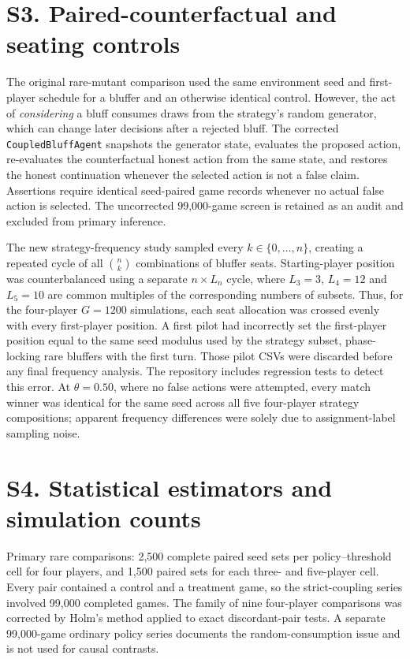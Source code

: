 \documentclass[10pt,a4paper]{article}
\begin{document}
\section*{S3. Paired-counterfactual and seating controls}
The original rare-mutant comparison used the same environment seed and first-player schedule for a bluffer and an otherwise identical control. However, the act of \emph{considering} a bluff consumes draws from the strategy's random generator, which can change later decisions after a rejected bluff. The corrected \texttt{CoupledBluffAgent} snapshots the generator state, evaluates the proposed action, re-evaluates the counterfactual honest action from the same state, and restores the honest continuation whenever the selected action is not a false claim. Assertions require identical seed-paired game records whenever no actual false action is selected. The uncorrected 99,000-game screen is retained as an audit and excluded from primary inference.

The new strategy-frequency study sampled every $k\in\{0,\ldots,n\}$, creating a repeated cycle of all $\binom nk$ combinations of bluffer seats. Starting-player position was counterbalanced using a separate $n\times L_n$ cycle, where $L_3=3$, $L_4=12$ and $L_5=10$ are common multiples of the corresponding numbers of subsets. Thus, for the four-player $G=1200$ simulations, each seat allocation was crossed evenly with every first-player position. A first pilot had incorrectly set the first-player position equal to the same seed modulus used by the strategy subset, phase-locking rare bluffers with the first turn. Those pilot CSVs were discarded before any final frequency analysis. The repository includes regression tests to detect this error. At $\theta=0.50$, where no false actions were attempted, every match winner was identical for the same seed across all five four-player strategy compositions; apparent frequency differences were solely due to assignment-label sampling noise.

\section*{S4. Statistical estimators and simulation counts}
Primary rare comparisons: 2,500 complete paired seed sets per policy--threshold cell for four players, and 1,500 paired sets for each three- and five-player cell. Every pair contained a control and a treatment game, so the strict-coupling series involved 99,000 completed games. The family of nine four-player comparisons was corrected by Holm's method applied to exact discordant-pair tests. A separate 99,000-game ordinary policy series documents the random-consumption issue and is not used for causal contrasts.
\end{document}

